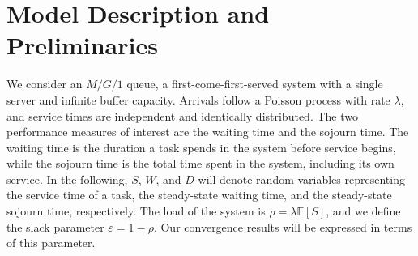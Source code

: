 \documentclass[11pt,letterpaper,reqno]{article}
\theoremstyle{thmstyleone}%
\theoremstyle{thmstyletwo}%
\theoremstyle{thmstylethree}%
\numberwithin{equation}{section}
\begin{document}
\section{Model Description and Preliminaries}
We consider an $M/G/1$ queue, a first-come-first-served system with a single server and infinite buffer capacity. Arrivals follow a Poisson process with rate $\lambda$, and service times are independent and identically distributed. The two performance measures of interest are the waiting time and the sojourn time. The waiting time is the duration a task spends in the system before service begins, while the sojourn time is the total time spent in the system, including its own service. 
In the following, $S$, $W$, and $D$ will denote random variables representing the service time of a task, the steady-state waiting time, and the steady-state sojourn time, respectively. The load of the system is $\rho = \lambda \mathbb{E}[S]$, and we define the slack parameter $\varepsilon = 1 - \rho$. Our convergence results will be expressed in terms of this parameter.
\end{document}
